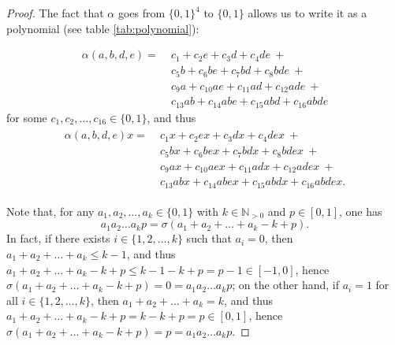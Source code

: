 \documentclass{book}
\theoremstyle{definition}
\theoremstyle{plain}
\theoremstyle{plain}
\theoremstyle{remark}
\theoremstyle{plain}
\begin{document}
	\begin{proof}
		The fact that $\alpha$ goes from $\{0,1\}^4$ to $\{0,1\}$ allows us to write it as a polynomial (see table \ref{tab:polynomial}):
		
		\begin{align*}
			\alpha(a,b,d,e)=\;&c_1+c_2e+c_3d+c_4de\:+\\
							  &c_5b+c_6be+c_7bd+c_8bde\:+\\
							  &c_9a+c_{10}ae+c_{11}ad+c_{12}ade\:+\\
							  &c_{13}ab+c_{14}abe+c_{15}abd+c_{16}abde
		\end{align*}
		for some $c_1,c_2,\dots,c_{16}\in\{0,1\}$, and thus
		\begin{align} \label{eq:polynomial}
			\begin{split}
				\alpha(a,b,d,e)x=\;&c_1x+c_2ex+c_3dx+c_4dex\:+\\
								   &c_5bx+c_6bex+c_7bdx+c_8bdex\:+\\
								   &c_9ax+c_{10}aex+c_{11}adx+c_{12}adex\:+\\
								   &c_{13}abx+c_{14}abex+c_{15}abdx+c_{16}abdex.
			\end{split}
		\end{align}
		
		Note that, for any $a_1,a_2,\dots,a_k\in\{0,1\}$ with $k\in\mathbb{N}_{>0}$ and $p\in[0,1]$, one has
		\begin{equation} \label{eq:towardsLemmaState}
			a_1a_2\dots a_kp=\sigma(a_1+a_2+\dots+a_k-k+p).
		\end{equation}
		In fact, if there exists $ i\in\{1,2,\dots,k\}$ such that $a_i=0$, then $a_1+a_2+\dots+a_k\leq k-1$, and thus $a_1+a_2+\dots+a_k-k+p\leq k-1-k+p=p-1\in[-1,0]$, hence $\sigma(a_1+a_2+\dots+a_k-k+p)=0=a_1a_2\dots a_kp$; on the other hand, if $a_i=1$ for all $i\in\{1,2,\dots,k\}$, then $a_1+a_2+\dots+a_k=k$, and thus $a_1+a_2+\dots+a_k-k+p=k-k+p=p\in[0,1]$, hence $\sigma(a_1+a_2+\dots+a_k-k+p)=p=a_1a_2\dots a_kp$.
		

\end{proof}
\end{document}
